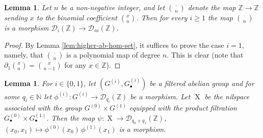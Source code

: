 \documentclass[a4paper,12pt,reqno]{amsart}
\newtheorem{lemma}[theorem]{Lemma}
\theoremstyle{definition}
\def\to{\rightarrow}
\newcommand{\mc}{\mathcal}
\newcommand{\mb}{\mathbb}
\DeclareMathOperator{\ns}{X}
\begin{document}
\begin{lemma}\label{lem:binompoly}
Let $n$ be a non-negative integer, and let  $\binom{\cdot}{n}$ denote the map $\mb{Z}\to \mb{Z}$ sending $x$ to the binomial coefficient $\binom{x}{n}$. Then for every $i\ge 1$ the map $\binom{\cdot}{n}$ is a morphism $\mc{D}_i(\mb{Z})\to \mc{D}_{ni}(\mb{Z})$.
\end{lemma}
\begin{proof}
By Lemma \ref{lem:higher-ab-hom-set}, it suffices to prove the case $i=1$, namely, that $\binom{\cdot}{n}$ is a polynomial map of degree $n$. This is clear (note that $\partial_1 \binom{x}{n}=\binom{x}{n-1}$ for any $x\in \mb{Z}$).
\end{proof}

\begin{lemma}\label{lem:prodpolys}
For $i\in\{0,1\}$, let $(G^{(i)},G^{(i)}_\bullet)$ be  a filtered abelian group and for some $q_i\in \mb{N}$ let $\phi^{(i)}:G^{(i)}\to \mc{D}_{q_i}(\mb{Z})$ be a morphism. Let $\ns$ be the nilspace associated with the group $G^{(0)}\times G^{(1)}$ equipped with the product filtration $G^{(0)}_\bullet\times G^{(1)}_\bullet$. Then the map $\psi:\ns \to \mc{D}_{q_0+q_1}(\mb{Z})$, $(x_0,x_1)\mapsto\phi^{(0)}(x_0)\,\phi^{(1)}(x_1)$ is a morphism.
\end{lemma}
\end{document}
